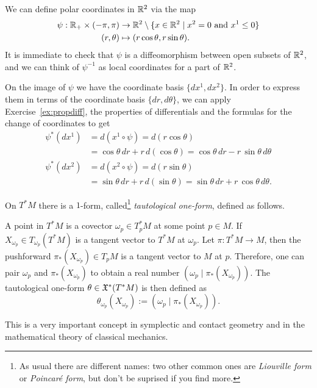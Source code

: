 \begin{example}
  We can define polar coordinates in $\mathbb{R}^2$ via the map
  \begin{align}
    \psi : \mathbb{R}_+\times (-\pi, \pi) & \to \mathbb{R}^2\setminus\{x\in\mathbb{R}^2\mid x^2=0 \mbox{ and } x^1 \leq 0\} \\
    (r, \theta)                   & \mapsto (r\cos\theta, r\sin\theta).
  \end{align}
  It is immediate to check that $\psi$ is a diffeomorphism between open subsets of $\mathbb{R}^2$, and we can think of $\psi^{-1}$ as local coordinates for a part of $\mathbb{R}^2$.

  On the image of $\psi$ we have the coordinate basis $\{dx^1, dx^2\}$. In order to express them in terms of the coordinate basis $\{dr,d\theta\}$, we can apply Exercise~\ref{ex:propdiff}, the properties of differentials and the formulas for the change of coordinates to get
  \begin{align}
    \psi^*(d x^1) & = d(x^1\circ \psi) = d(r\cos\theta)                                            \\
                  & = \cos\theta \,dr +r\,d(\cos\theta) = \cos\theta \,dr -r\,\sin\theta\,d\theta  \\
    \psi^*(d x^2) & = d(x^2\circ \psi) = d(r\sin\theta)                                            \\
                  & = \sin\theta \,dr +r\,d(\sin\theta) = \sin\theta \,dr +r\,\cos\theta\,d\theta.
  \end{align}
\end{example}

\begin{example}
  On $T^*M$ there is a $1$-form, called\footnote{As usual there are different names: two other common ones are \emph{Liouville form} or \emph{Poincar\'e form}, but don't be suprised if you find more.} \emph{tautological one-form}, defined as follows.

  A point in $T^*M$ is a covector $\omega_p\in T^*_p M$ at some point $p\in M$. If $X_{\omega_p}\in T_{\omega_p}(T^*M)$ is a tangent vector to $T^*M$ at $\omega_p$. Let $\pi:T^*M \to M$, then the pushforward $\pi_*(X_{\omega_p})\in T_p M$ is a tangent vector to $M$ at $p$.
  Therefore, one can pair $\omega_p$ and $\pi_*(X_{\omega_p})$ to obtain a real number $\left(\omega_p\;\big|\;\pi_*(X_{\omega_p})\right)$.
  The tautological one-form $\theta\in\mathfrak{X}^*(T^*M)$ is then defined as
  \begin{equation}
    \theta_{\omega_p}(X_{\omega_p}) := \left(\omega_p\;\Big|\;\pi_*(X_{\omega_p})\right).
  \end{equation}

  This is a very important concept in symplectic and contact geometry and in the mathematical theory of classical mechanics.
\end{example}

